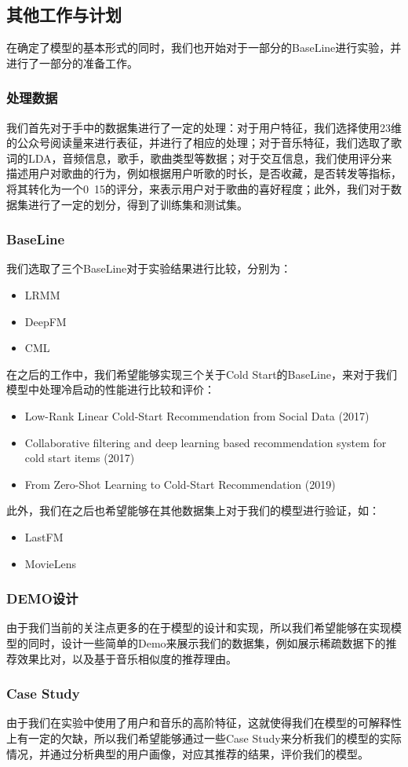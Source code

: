 \subsection{其他工作与计划}
在确定了模型的基本形式的同时，我们也开始对于一部分的BaseLine进行实验，并进行了一部分的准备工作。

\subsubsection{处理数据}
我们首先对于手中的数据集进行了一定的处理：对于用户特征，我们选择使用23维的公众号阅读量来进行表征，并进行了相应的处理；对于音乐特征，我们选取了歌词的LDA，音频信息，歌手，歌曲类型等数据；对于交互信息，我们使用评分来描述用户对歌曲的行为，例如根据用户听歌的时长，是否收藏，是否转发等指标，将其转化为一个0~15的评分，来表示用户对于歌曲的喜好程度；此外，我们对于数据集进行了一定的划分，得到了训练集和测试集。

\subsubsection{BaseLine}
我们选取了三个BaseLine对于实验结果进行比较，分别为：
\begin{itemize}
    \item LRMM\cite{LRMM}
    \item DeepFM\cite{guo2017deepfm}
    \item CML\cite{CML}
\end{itemize}

在之后的工作中，我们希望能够实现三个关于Cold Start的BaseLine，来对于我们模型中处理冷启动的性能进行比较和评价：
\begin{itemize}
    \item Low-Rank Linear Cold-Start Recommendation from Social Data (2017)\cite{sedhain2017low}
    \item Collaborative filtering and deep learning based recommendation system for cold start items (2017)\cite{wei2017collaborative}
    \item From Zero-Shot Learning to Cold-Start Recommendation (2019)\cite{li2019zero}
\end{itemize}

此外，我们在之后也希望能够在其他数据集上对于我们的模型进行验证，如：
\begin{itemize}
    \item LastFM\cite{Zafarani+Liu:2009}
    \item MovieLens\cite{Harper:2015:MDH:2866565.2827872}
\end{itemize}

\subsubsection{DEMO设计}
由于我们当前的关注点更多的在于模型的设计和实现，所以我们希望能够在实现模型的同时，设计一些简单的Demo来展示我们的数据集，例如展示稀疏数据下的推荐效果比对，以及基于音乐相似度的推荐理由。

\subsubsection{Case Study}
由于我们在实验中使用了用户和音乐的高阶特征，这就使得我们在模型的可解释性上有一定的欠缺，所以我们希望能够通过一些Case Study来分析我们的模型的实际情况，并通过分析典型的用户画像，对应其推荐的结果，评价我们的模型。